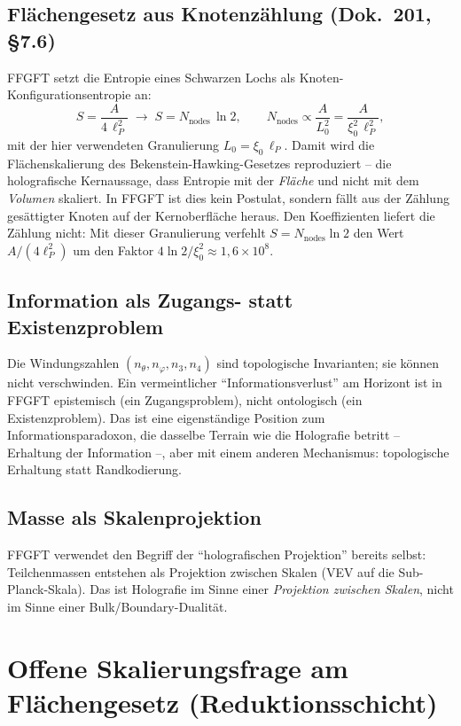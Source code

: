 \subsection*{Flächengesetz aus Knotenzählung (Dok.~201, §7.6)}

FFGFT setzt die Entropie eines Schwarzen Lochs als
Knoten-Konfigurationsentropie an:
\[
S = \frac{A}{4\,\ell_P^2} \;\longrightarrow\; S = N_{\text{nodes}}\,\ln 2,
\qquad N_{\text{nodes}} \propto \frac{A}{L_0^2} = \frac{A}{\xi_0^2\,\ell_P^2},
\]
mit der hier verwendeten Granulierung $L_0=\xi_0\,\ell_P$. Damit wird die
Flächenskalierung des Bekenstein-Hawking-Gesetzes reproduziert -- die holografische
Kernaussage, dass Entropie mit der \emph{Fläche} und nicht mit dem
\emph{Volumen} skaliert. In FFGFT ist dies kein Postulat, sondern fällt
aus der Zählung gesättigter Knoten auf der Kernoberfläche heraus. Den
Koeffizienten liefert die Zählung nicht: Mit dieser Granulierung verfehlt
$S=N_{\text{nodes}}\ln 2$ den Wert $A/(4\ell_P^2)$ um den Faktor
$4\ln 2/\xi_0^2\approx1{,}6\times10^8$.

\subsection*{Information als Zugangs- statt Existenzproblem}

Die Windungszahlen $(n_\theta, n_\varphi, n_3, n_4)$ sind topologische
Invarianten; sie können nicht verschwinden. Ein vermeintlicher
\enquote{Informationsverlust} am Horizont ist in FFGFT epistemisch (ein
Zugangsproblem), nicht ontologisch (ein Existenzproblem). Das ist eine
eigenständige Position zum Informationsparadoxon, die dasselbe Terrain wie
die Holografie betritt -- Erhaltung der Information --, aber mit einem
anderen Mechanismus: topologische Erhaltung statt Randkodierung.

\subsection*{Masse als Skalenprojektion}

FFGFT verwendet den Begriff der \enquote{holografischen Projektion} bereits
selbst: Teilchenmassen entstehen als Projektion zwischen Skalen (VEV auf die
Sub-Planck-Skala). Das ist Holografie im Sinne einer \emph{Projektion
zwischen Skalen}, nicht im Sinne einer Bulk/Boundary-Dualität.

\section{Offene Skalierungsfrage am Flächengesetz (Reduktionsschicht)}
\label{sec:263-offen}

